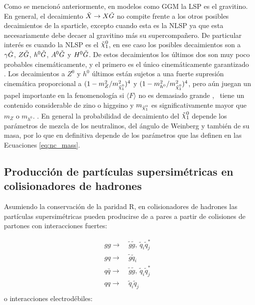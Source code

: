 Como se mencionó anteriormente, en modelos como GGM la LSP es el gravitino. En general, el decaimiento $\tilde{X} \to X\tilde{G}$ no compite frente a los otros posibles decaimientos de la sparticle, excepto cuando esta es la NLSP ya que esta necesariamente debe decaer al gravitino más su supercompañero. De particular interés es cuando la NLSP es el $\ninoone$, en ese caso los posibles decaimientos son a $\gamma\tilde{G}$, $Z\tilde{G}$, $h^0\tilde{G}$, $A^0\tilde{G}$ y $H^0\tilde{G}$. De estos decaimientos los últimos dos son muy poco probables cinemáticamente, y el primero es el único cinemáticamente garantizado . Los decaimientos a $Z^0$ y $h^0$ últimos están sujetos a una fuerte supresión cinemática proporcional a $ (1-m_{Z}^{2}/m_{\ninoone}^{2})^4$ y $(1-m_{h^{0}}^{2}/m_{\ninoone}^{2})^4$, pero aún juegan un papel importante en la fenomenología si $ \langle F \rangle $ no es demasiado grande , \ninoone\ tiene un contenido considerable de zino o higgsino y $m_{\ninoone}$ es significativamente mayor que $m_{Z}$ o $m_{h^{0}}$. . En general la probabilidad de decaimiento del $\ninoone$ depende los parámetros de mezcla de los neutralinos, del ángulo de Weinberg y también de su masa, por lo que en definitiva depende de los parámetros que las definen en las Ecuaciones \ref{eq:nc_mass}.

\subsection{Producción de partículas supersimétricas en colisionadores de hadrones}

Asumiendo la conservación de la paridad R, en colisionadores de hadrones las partículas supersimétricas pueden producirse de a pares a partir de colisiones de partones con interacciones fuertes:

\begin{equation}
	\begin{split}
		gg\to &\ \tilde{g}\tilde{g},\ \tilde{q}_i\tilde{q}_j^* \\ 
		gq\to &\ \tilde{g}\tilde{q}_i \\ 
		q\bar{q}\to &\ \tilde{g}\tilde{g},\ \tilde{q}_i\tilde{q}_j^* \\ 
		qq\to &\ \tilde{q}_i\tilde{q}_j \\ 
	\end{split}
\end{equation}
%
o interacciones electrodébiles:

